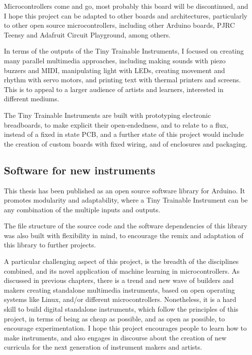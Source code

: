 Microcontrollers come and go, most probably this board will be discontinued, and I hope this project can be adapted to other boards and architectures, particularly to other open source microcontrollers, including other Arduino boards, PJRC Teensy and Adafruit Circuit Playground, among others.

In terms of the outputs of the Tiny Trainable Instruments, I focused on creating many parallel multimedia approaches, including making sounds with piezo buzzers and MIDI, manipulating light with LEDs, creating movement and rhythm with servo motors, and printing text with thermal printers and screens. This is to appeal to a larger audience of artists and learners, interested in different mediums.

The Tiny Trainable Instruments are built with prototyping electronic breadboards, to make explicit their open-endedness, and to relate to a flux, instead of a fixed in state PCB, and a further state of this project would include the creation of custom boards with fixed wiring, and of enclosures and packaging.

\subsection{Software for new instruments}

This thesis has been published as an open source software library for Arduino. It promotes modularity and adaptability, where a Tiny Trainable Instrument can be any combination of the multiple inputs and outputs.

The file structure of the source code and the software dependencies of this library was also built with flexibility in mind, to encourage the remix and adaptation of this library to further projects.

A particular challenging aspect of this project, is the breadth of the disciplines combined, and its novel application of machine learning in microcontrollers. As discussed in previous chapters, there is a trend and new wave of builders and makers creating standalone multimedia instruments, based on open operating systems like Linux, and/or different microcontrollers. Nonetheless, it is a hard skill to build digital standalone instruments, which follow the principles of this project, in terms of being as cheap as possible, and as open as possible, to encourage experimentation. I hope this project encourages people to learn how to make instruments, and also engages in discourse about the creation of new curricula for the next generation of instrument makers and artists.

